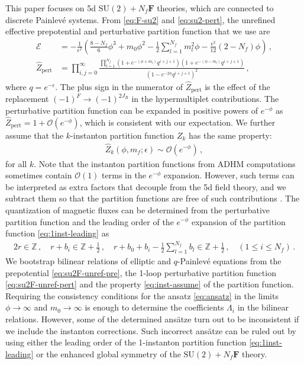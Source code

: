 \documentclass[11pt, a4paper]{article}
\theoremstyle{definition}
\begin{document}
This paper focuses on 5d $ \mathrm{SU}(2) + N_f\mathbf{F} $ theories, which are connected to discrete Painlev\'e systems. From \eqref{eq:F-su2} and \eqref{eq:su2-pert}, the unrefined effective prepotential and perturbative partition function that we use are
\begin{align}
    \mathcal{E} &= -\frac{1}{\epsilon^2} \left( \frac{8-N_f}{6}\phi^3 + m_0\phi^2  - \frac{1}{2} \sum_{l=1}^{N_f} m_l^2 \phi  - \frac{\epsilon^2}{12} (2-N_f) \phi \right) \, , \label{eq:su2F-unref-pre} \\
    \hat{Z}_{\mathrm{pert}} &= \prod_{i,j=0}^\infty \frac{\prod_{l=1}^{N_f} (1 + e^{-(\phi+m_l)} q^{i+j+1}) (1+ e^{-(\phi-m_l)} q^{i+j+1})}{(1- e^{-2\phi} q^{i+j+1})^2} \, , \label{eq:su2F-unref-pert}
\end{align}
where $ q=e^{-\epsilon} $. The plus sign in the numerator of $ \hat{Z}_{\mathrm{pert}} $ is the effect of the replacement $ (-1)^F \to (-1)^{2J_R} $ in the hypermultiplet contributions. The perturbative partition function can be expanded in positive powers of $ e^{-\phi} $ as $ \hat{Z}_{\mathrm{pert}} = 1 + \mathcal{O}(e^{-\phi}) $, which is consistent with our expectation. We further assume that the $ k $-instanton partition function $ Z_k $ has the same property:
\begin{align}\label{eq:inst-assume}
    \hat{Z}_k(\phi,m_f; \epsilon) \sim \mathcal{O}(e^{-\phi}) \, ,
\end{align}
for all $ k $. Note that the instanton partition functions from ADHM computations sometimes contain $ \mathcal{O}(1) $ terms in the $ e^{-\phi} $ expansion. However, such terms can be interpreted as extra factors that decouple from the 5d field theory, and we subtract them so that the partition functions are free of such contributions \cite{Hwang:2014uwa, Kim:2020hhh}. The quantization of magnetic fluxes can be determined from the perturbative partition function and the leading order of the $ e^{-\phi} $ expansion of the partition function \eqref{eq:1inst-leading} as
\begin{align}\label{eq:Nf-quantization}
    2r \in \mathbb{Z} \, , \quad
    r + b_i \in \mathbb{Z} + \frac{1}{2} \, , \quad
    r + b_0 + b_i - \frac{1}{2} \sum_{l=1}^{N_f} b_l \in \mathbb{Z} + \frac{1}{2} \, , \quad (1 \leq i \leq N_f) \, .
\end{align}
We bootstrap bilinear relations of elliptic and $ q $-Painlev\'e equations from the prepotential \eqref{eq:su2F-unref-pre}, the 1-loop perturbative partition function \eqref{eq:su2F-unref-pert} and the property \eqref{eq:inst-assume} of the partition function. Requiring the consistency conditions for the ansatz \eqref{eq:ansatz} in the limits $ \phi \to \infty $ and $ m_0 \to \infty $ is enough to determine the coefficients $ \Lambda_i $ in the bilinear relations. However, some of the determined ans\"atze turn out to be inconsistent if we include the instanton corrections. Such incorrect ans\"atze can be ruled out by using either the leading order of the 1-instanton partition function \eqref{eq:1inst-leading} or the enhanced global symmetry of the $ \mathrm{SU}(2)+N_f \mathbf{F} $ theory.
\end{document}
